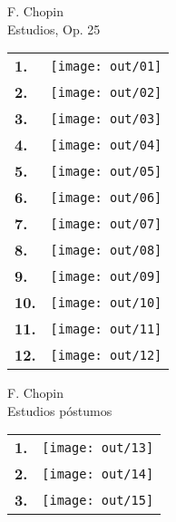 \documentclass[a4paper,13pt,oneside,headinclude,titlepage]{article} %
\newcommand{\imgw}{0.67}
\newlength{\colw}
\newcommand{\tn}{\\[1.5ex]}
\begin{document}
\begin{center}
\vfill
{\huge F. Chopin}\\[1ex]
{\huge Estudios, Op. 25}\\[1ex]
\vfill
\begin{tabular}{>{\bfseries}m{2ex}m{\colw}}
1.&\texttt{[image: out/01]}\tn
2.&\texttt{[image: out/02]}\tn
3.&\texttt{[image: out/03]}\tn
4.&\texttt{[image: out/04]}\tn
5.&\texttt{[image: out/05]}\tn
6.&\texttt{[image: out/06]}\tn
7.&\texttt{[image: out/07]}\tn
8.&\texttt{[image: out/08]}\tn
9.&\texttt{[image: out/09]}\tn
10.&\texttt{[image: out/10]}\tn
11.&\texttt{[image: out/11]}\tn
12.&\texttt{[image: out/12]}\tn
\end{tabular}
\vfill
\newpage
{\huge F. Chopin}\\[1ex]
{\huge Estudios póstumos}\\[1ex]
\vfill
\renewcommand{\tn}{\\[5ex]}
\begin{tabular}{>{\bfseries}m{2ex}m{\colw}}
1.&\texttt{[image: out/13]}\tn
2.&\texttt{[image: out/14]}\tn
3.&\texttt{[image: out/15]}\tn
\end{tabular}
\end{center}
\vfill
\end{document}
